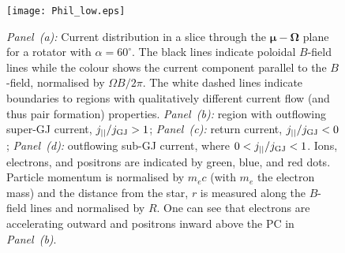 \documentclass{PoS}
\begin{document}
\begin{figure}[t]
  \begin{center}
  \texttt{[image: Phil\_low.eps]}
  \caption{\textit{Panel~(a):} Current distribution in a slice through the $\bm{\mu}-\bm{\Omega}$ plane for a rotator with $\alpha=60^\circ$. The black lines indicate  poloidal $B$-field lines while the colour shows the current component parallel to the $B$-field, normalised by $\Omega B/2\pi$. The white dashed lines indicate boundaries to regions with qualitatively different current flow (and thus pair formation) properties. \textit{Panel~(b):} region with outflowing super-GJ current, $j_{||}/j_{\rm GJ}> 1$; \textit{Panel~(c):} return current, $j_{||}/j_{\rm GJ} < 0$; \textit{Panel~(d):} outflowing sub-GJ current, where $0 < j_{||}/j_{\rm GJ} < 1$.  Ions, electrons, and positrons are indicated by green, blue, and red dots.  Particle momentum is normalised by $m_e c$ (with $m_e$ the electron mass) and the distance from the star, $r$ is measured along the $B$-field lines and normalised by $R$.  One can see that electrons are accelerating outward and positrons inward above the PC in \textit{Panel~(b)}.}
  \label{fig:Phil}
  \end{center}
\end{figure}
\end{document}

